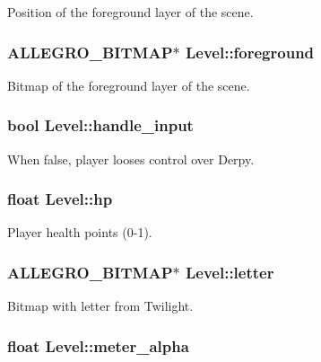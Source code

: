 \-Position of the foreground layer of the scene. \hypertarget{structLevel_a26c758ccdc7404a3ee0e766d1cbbf0be}{
\subsubsection[{foreground}]{\setlength{\rightskip}{0pt plus 5cm}\-A\-L\-L\-E\-G\-R\-O\-\_\-\-B\-I\-T\-M\-A\-P$\ast$ {\bf \-Level\-::foreground}}}\label{structLevel_a26c758ccdc7404a3ee0e766d1cbbf0be}
\-Bitmap of the foreground layer of the scene. \hypertarget{structLevel_a06cf4f2da517284d2006540051d3e5c0}{
\subsubsection[{handle\-\_\-input}]{\setlength{\rightskip}{0pt plus 5cm}bool {\bf \-Level\-::handle\-\_\-input}}}\label{structLevel_a06cf4f2da517284d2006540051d3e5c0}
\-When false, player looses control over \-Derpy. \hypertarget{structLevel_a49df009e8113251cfcb48fe17df0b571}{
\subsubsection[{hp}]{\setlength{\rightskip}{0pt plus 5cm}float {\bf \-Level\-::hp}}}\label{structLevel_a49df009e8113251cfcb48fe17df0b571}
\-Player health points (0-\/1). \hypertarget{structLevel_af1b1699478b4633d76c01ea09e666df4}{
\subsubsection[{letter}]{\setlength{\rightskip}{0pt plus 5cm}\-A\-L\-L\-E\-G\-R\-O\-\_\-\-B\-I\-T\-M\-A\-P$\ast$ {\bf \-Level\-::letter}}}\label{structLevel_af1b1699478b4633d76c01ea09e666df4}
\-Bitmap with letter from \-Twilight. \hypertarget{structLevel_a246ce1ecf1523db218cf067df15e511f}{
\subsubsection[{meter\-\_\-alpha}]{\setlength{\rightskip}{0pt plus 5cm}float {\bf \-Level\-::meter\-\_\-alpha}}}\label{structLevel_a246ce1ecf1523db218cf067df15e511f}
